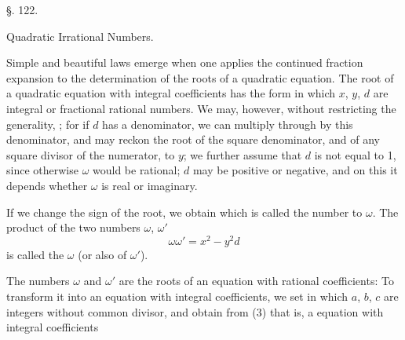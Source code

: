\begin{center}
§. 122.

Quadratic Irrational Numbers.
\end{center}

Simple and beautiful laws emerge when one applies the continued fraction expansion to the determination of the roots of a quadratic equation. The root of a quadratic equation with integral coefficients has the form
in which $x$, $y$, $d$ are integral or fractional rational numbers. We may, however, without restricting the generality, ; for if $d$ has a denominator, we can multiply through by this denominator, and may reckon the root of the square denominator, and of any square divisor of the numerator, to $y$; we further assume that $d$ is not equal to 1, since otherwise $\omega$ would be rational; $d$ may be positive or negative, and on this it depends whether $\omega$ is real or imaginary.

If we change the sign of the root, we obtain
which is called the number  to $\omega$. The product of the two numbers $\omega$, $\omega'$
\[
\omega\omega' = x^2 - y^2 d
\]
is called the  $\omega$ (or also of $\omega'$). 

The numbers $\omega$ and $\omega'$ are the roots of an equation with rational coefficients:
To transform it into an equation with integral coefficients, we set
in which $a$, $b$, $c$ are integers without common divisor, and obtain from (3)
that is, a  equation with integral coefficients\par %
